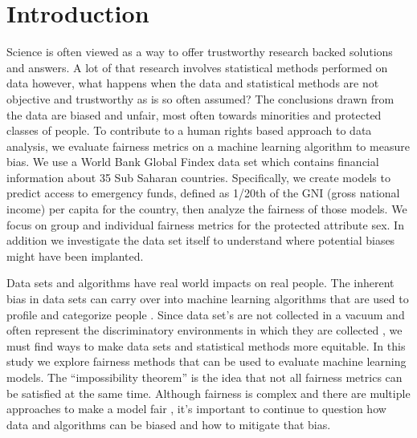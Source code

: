 \documentclass[water,article,submit,moreauthors,pdftex]{mdpi}
\begin{document}

\begin{Shaded}
\begin{Highlighting}[]
\NormalTok{(} \NormalTok{)}
\end{Highlighting}
\end{Shaded}

\hypertarget{introduction}{%
\section{Introduction}\label{introduction}}

Science is often viewed as a way to offer trustworthy research backed
solutions and answers. A lot of that research involves statistical
methods performed on data however, what happens when the data and
statistical methods are not objective and trustworthy as is so often
assumed? The conclusions drawn from the data are biased and unfair, most
often towards minorities and protected classes of people. To contribute
to a human rights based approach to data analysis, we evaluate fairness
metrics on a machine learning algorithm to measure bias. We use a World
Bank Global Findex data set which contains financial information about
35 Sub Saharan countries. Specifically, we create models to predict
access to emergency funds, defined as 1/20th of the GNI (gross national
income) per capita for the country, then analyze the fairness of those
models. We focus on group and individual fairness metrics for the
protected attribute sex. In addition we investigate the data set itself
to understand where potential biases might have been implanted.

Data sets and algorithms have real world impacts on real people. The
inherent bias in data sets can carry over into machine learning
algorithms that are used to profile and categorize people
\citep{navarro2021risk, hellstrom2020bias}. Since data set's are not
collected in a vacuum and often represent the discriminatory
environments in which they are collected
\citep{barocas_fairness_nodate}, we must find ways to make data sets and
statistical methods more equitable. In this study we explore fairness
methods that can be used to evaluate machine learning models. The
``impossibility theorem'' is the idea that not all fairness metrics can
be satisfied at the same time\citep{kleinberg2016inherent}. Although
fairness is complex and there are multiple approaches to make a model
fair \citep{kypraiou_what_2021, green2018myth}, it's important to
continue to question how data and algorithms can be biased and how to
mitigate that bias.
\end{document}
